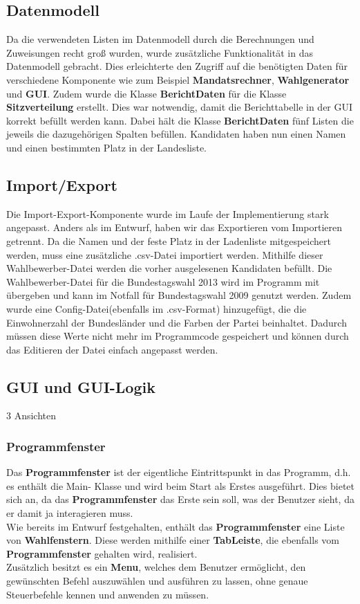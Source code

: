 \documentclass[12pt,a4paper,titlepage]{article}
\newcommand{\myma}{\fontfamily{pcr}\selectfont \textbf}
\begin{document}
\subsection{Datenmodell}
Da die verwendeten Listen im Datenmodell durch die Berechnungen und Zuweisungen recht groß wurden, wurde zusätzliche Funktionalität in das Datenmodell gebracht. Dies erleichterte den Zugriff auf die benötigten Daten für verschiedene Komponente wie zum Beispiel {\myma{Mandatsrechner}}, {\myma{Wahlgenerator}} und {\myma{GUI}}.
Zudem wurde die Klasse {\myma{BerichtDaten}} für die Klasse {\myma{Sitzverteilung}} erstellt. Dies war notwendig, damit die Berichttabelle in der GUI korrekt befüllt werden kann. Dabei hält die Klasse {\myma{BerichtDaten}} fünf Listen die jeweils die dazugehörigen Spalten befüllen. 
Kandidaten haben nun einen Namen und einen bestimmten Platz in der Landesliste.
\subsection{Import/Export}	
Die Import-Export-Komponente wurde im Laufe der Implementierung stark angepasst. Anders als im Entwurf, haben wir das Exportieren vom Importieren getrennt. Da die Namen und der feste Platz in der Ladenliste mitgespeichert werden, muss eine zusätzliche .csv-Datei importiert werden. Mithilfe dieser Wahlbewerber-Datei werden die vorher ausgelesenen Kandidaten befüllt. Die Wahlbewerber-Datei für die Bundestagswahl 2013 wird im Programm mit übergeben und kann im Notfall für Bundestagswahl 2009 genutzt werden. Zudem wurde eine Config-Datei(ebenfalls im .csv-Format) hinzugefügt, die die Einwohnerzahl der Bundesländer und die Farben der Partei beinhaltet. Dadurch müssen diese Werte nicht mehr im Programmcode gespeichert und können durch das Editieren der Datei einfach angepasst werden. 

\subsection{GUI und GUI-Logik}
3 Ansichten 
\subsubsection{Programmfenster}
Das {\myma{Programmfenster}} ist der eigentliche Eintrittspunkt in das Programm, d.h. es enthält die Main- Klasse und wird beim Start als Erstes ausgeführt. Dies bietet sich an, da das {\myma{Programmfenster}} das Erste sein soll, was der Benutzer sieht, da er damit ja interagieren muss. \\
Wie bereits im Entwurf festgehalten, enthält das {\myma{Programmfenster}} eine Liste von {\myma{Wahlfenstern}}. Diese werden mithilfe einer {\myma{TabLeiste}}, die ebenfalls vom {\myma{Programmfenster}} gehalten wird, realisiert. \\
Zusätzlich besitzt es ein {\myma{Menu}}, welches dem Benutzer ermöglicht, den gewünschten Befehl auszuwählen und ausführen zu lassen, ohne genaue Steuerbefehle kennen und anwenden zu müssen. \\
	
\end{document}
